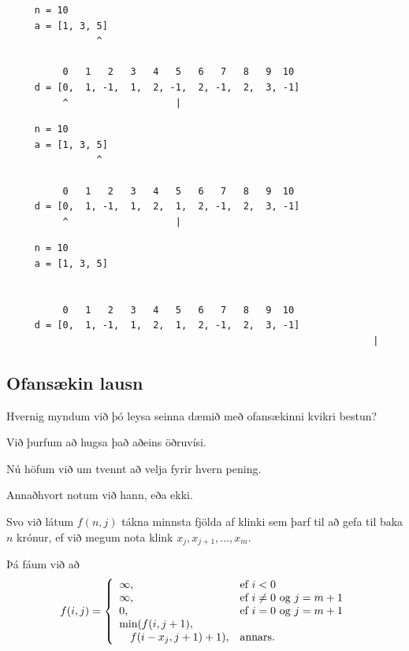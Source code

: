 \begin{frame}[fragile]
\begin{verbatim}
     n = 10
     a = [1, 3, 5]
                ^

          0   1   2   3   4   5   6   7   8   9  10
     d = [0,  1, -1,  1,  2, -1,  2, -1,  2,  3, -1]
          ^                   |
\end{verbatim}
\end{frame}
\addtocounter{framenumber}{-1}

\begin{frame}[fragile]
\begin{verbatim}
     n = 10
     a = [1, 3, 5]
                ^

          0   1   2   3   4   5   6   7   8   9  10
     d = [0,  1, -1,  1,  2,  1,  2, -1,  2,  3, -1]
          ^                   |
\end{verbatim}
\end{frame}
\addtocounter{framenumber}{-1}

\begin{frame}[fragile]
\begin{verbatim}
     n = 10
     a = [1, 3, 5]
                 

          0   1   2   3   4   5   6   7   8   9  10
     d = [0,  1, -1,  1,  2,  1,  2, -1,  2,  3, -1]
                                                                 |
\end{verbatim}
\end{frame}

\subsection{Ofansækin lausn}
{
    {
        \item<1-> Hvernig myndum við þó leysa seinna dæmið með ofansækinni kvikri bestun?
        \item<2-> Við þurfum að hugsa það aðeins öðruvísi.
        \item<3-> Nú höfum við um tvennt að velja fyrir hvern pening.
        \item<4-> Annaðhvort notum við hann, eða ekki.
        \item<5-> Svo við látum $f(n, j)$ tákna minnsta fjölda af klinki sem þarf til að gefa til baka $n$ krónur,
            ef við megum nota klink $x_j, x_{j + 1}, ..., x_m$.
        \item<6-> Þá fáum við að
        \[
            f(i, j) = \left \{
            \env{array}
            {
                {l l}
                \infty, & \text{ef $i < 0$}\\
                \infty, & \text{ef $i \neq 0$ og $j = m + 1$}\\
                0, & \text{ef $i = 0$ og $j = m + 1$}\\
                \text{min}(f(i, j + 1), &\\
                        \quad f(i - x_j, j + 1) + 1), & \text{annars.}\\
            }
            \right .
        \]
    }
}

